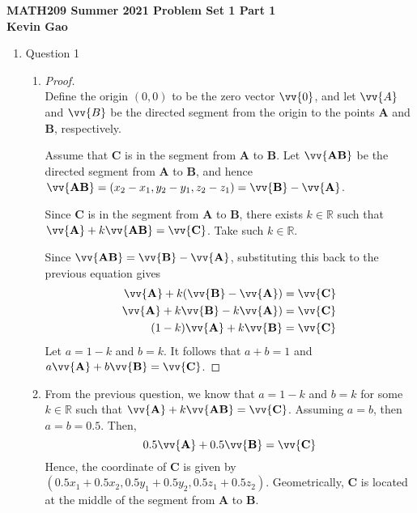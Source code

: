 \documentclass[11pt]{article}
\def\R {{\mathbb R}}
\begin{document}
\begin{center}

{\bf \Large \bf MATH209 Summer 2021 Problem Set 1 Part 1}\\
{\bf \large Kevin Gao}
\end{center}

\begin{enumerate}
    \item Question 1
    \hfill
    \begin{enumerate}
        \item 
        \begin{proof}
        \hfill \\
        Define the origin $(0,0)$ to be the zero vector $\vv{0}$, and let $\vv{A}$ and $\vv{B}$ be the directed segment from the origin to the points $\mathbf{A}$ and $\mathbf{B}$, respectively.
        
        Assume that $\mathbf C$ is in the segment from $\mathbf A$ to $\mathbf B$. Let $\vv{\mathbf{AB}}$ be the directed segment from $\mathbf A$ to $\mathbf B$, and hence $\vv{\mathbf{AB}} = ( x_2-x_1, y_2-y_1, z_2-z_1 ) = \vv{\mathbf B} - \vv{\mathbf A}$.
        
        Since $\mathbf C$ is in the segment from $\mathbf A$ to $\mathbf B$, there exists $k \in \R$ such that $\vv{\mathbf A} + k \vv{\mathbf{AB}} = \vv{\mathbf C}$. Take such $k \in \R$.
        
        Since $\vv{\mathbf{AB}} = \vv{\mathbf B} - \vv{\mathbf A}$, substituting this back to the previous equation gives
        \begin{align*}
            \vv{\mathbf A} + k (\vv{\mathbf B} - \vv{\mathbf A}) &= \vv{\mathbf C} \\
            \vv{\mathbf A} + k \vv{\mathbf B} - k \vv{\mathbf A}) &= \vv{\mathbf C} \\
            (1-k)\vv{\mathbf A} + k \vv{\mathbf B} &= \vv{\mathbf C}
        \end{align*}
        Let $a = 1-k$ and $b = k$. It follows that $a+b = 1$ and $a\vv{\mathbf A} + b\vv{\mathbf B} = \vv{\mathbf C}$.
        \end{proof}
        
        
        \item 
        From the previous question, we know that $a=1-k$ and $b=k$ for some $k \in \R$ such that $\vv{\mathbf A} + k \vv{\mathbf{AB}} = \vv{\mathbf C}$. Assuming $a=b$, then $a = b = 0.5$. Then,
        $$
        0.5\vv{\mathbf A} + 0.5\vv{\mathbf B} = \vv{\mathbf C}
        $$
        Hence, the coordinate of $\mathbf C$ is given by $(0.5x_1+0.5x_2, 0.5y_1+0.5y_2, 0.5z_1+0.5z_2)$. Geometrically, $\mathbf C$ is located at the middle of the segment from $\mathbf A$ to $\mathbf B$.
    \end{enumerate}
    

\end{enumerate}
\end{document}
